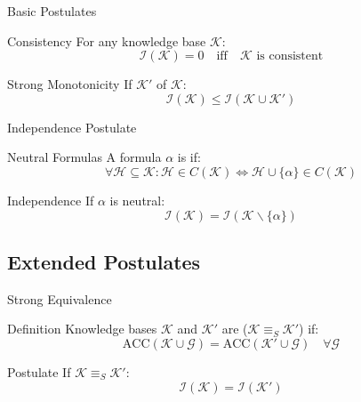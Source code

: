 \begin{frame}{Basic Postulates}
    \begin{block}{Consistency}
        For any knowledge base $\mathcal{K}$:
        \[
            \mathcal{I}(\mathcal{K}) = 0 \quad \text{iff} \quad \mathcal{K} \text{ is consistent}
        \]
    \end{block}
    \begin{block}{Strong Monotonicity}
        If $\mathcal{K}'$  of $\mathcal{K}$:
        \[
            \mathcal{I}(\mathcal{K}) \leq \mathcal{I}(\mathcal{K} \cup \mathcal{K}')
        \]
    \end{block}
\end{frame}

\begin{frame}{Independence Postulate}
    \begin{block}{Neutral Formulas}
        A formula $\alpha$ is  if:
        \[
            \forall \mathcal{H} \subseteq \mathcal{K}: \mathcal{H} \in C(\mathcal{K}) \Leftrightarrow \mathcal{H} \cup \{\alpha\} \in C(\mathcal{K})
        \]
    \end{block}
    \begin{block}{Independence}
        If $\alpha$ is neutral:
        \[
            \mathcal{I}(\mathcal{K}) = \mathcal{I}(\mathcal{K} \backslash \{\alpha\})
        \]
    \end{block}
\end{frame}

\subsection{Extended Postulates}

\begin{frame}{Strong Equivalence}
    \begin{block}{Definition}
        Knowledge bases $\mathcal{K}$ and $\mathcal{K}'$ are  ($\mathcal{K} \equiv_S \mathcal{K}'$) if:
        \[
            \text{ACC}(\mathcal{K} \cup \mathcal{G}) = \text{ACC}(\mathcal{K}' \cup \mathcal{G}) \quad \forall \mathcal{G}
        \]
    \end{block}
    \begin{block}{Postulate}
        If $\mathcal{K} \equiv_S \mathcal{K}'$:
        \[
            \mathcal{I}(\mathcal{K}) = \mathcal{I}(\mathcal{K}')
        \]
    \end{block}
\end{frame}

